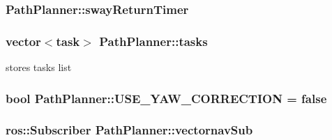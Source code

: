 \subsubsection[{\texorpdfstring{sway\+Return\+Timer}{swayReturnTimer}}]{ Path\+Planner\+::sway\+Return\+Timer}\hypertarget{classPathPlanner_a449a30ac5feb833004e42156124aeb35}{}\label{classPathPlanner_a449a30ac5feb833004e42156124aeb35}
\subsubsection[{\texorpdfstring{tasks}{tasks}}]{\setlength{\rightskip}{0pt plus 5cm}vector$<${\bf task}$>$ Path\+Planner\+::tasks}\hypertarget{classPathPlanner_afaaad3d73c413de1915e48dd7f9ef263}{}\label{classPathPlanner_afaaad3d73c413de1915e48dd7f9ef263}


stores tasks list 

\subsubsection[{\texorpdfstring{U\+S\+E\+\_\+\+Y\+A\+W\+\_\+\+C\+O\+R\+R\+E\+C\+T\+I\+ON}{USE_YAW_CORRECTION}}]{\setlength{\rightskip}{0pt plus 5cm}bool Path\+Planner\+::\+U\+S\+E\+\_\+\+Y\+A\+W\+\_\+\+C\+O\+R\+R\+E\+C\+T\+I\+ON = false}\hypertarget{classPathPlanner_a54e431dfde30e0b15a372c5a16c8dd6c}{}\label{classPathPlanner_a54e431dfde30e0b15a372c5a16c8dd6c}
\subsubsection[{\texorpdfstring{vectornav\+Sub}{vectornavSub}}]{\setlength{\rightskip}{0pt plus 5cm}ros\+::\+Subscriber Path\+Planner\+::vectornav\+Sub}\hypertarget{classPathPlanner_a0527b6b13cdffd139aa4e2acbcb8cc32}{}\label{classPathPlanner_a0527b6b13cdffd139aa4e2acbcb8cc32}
